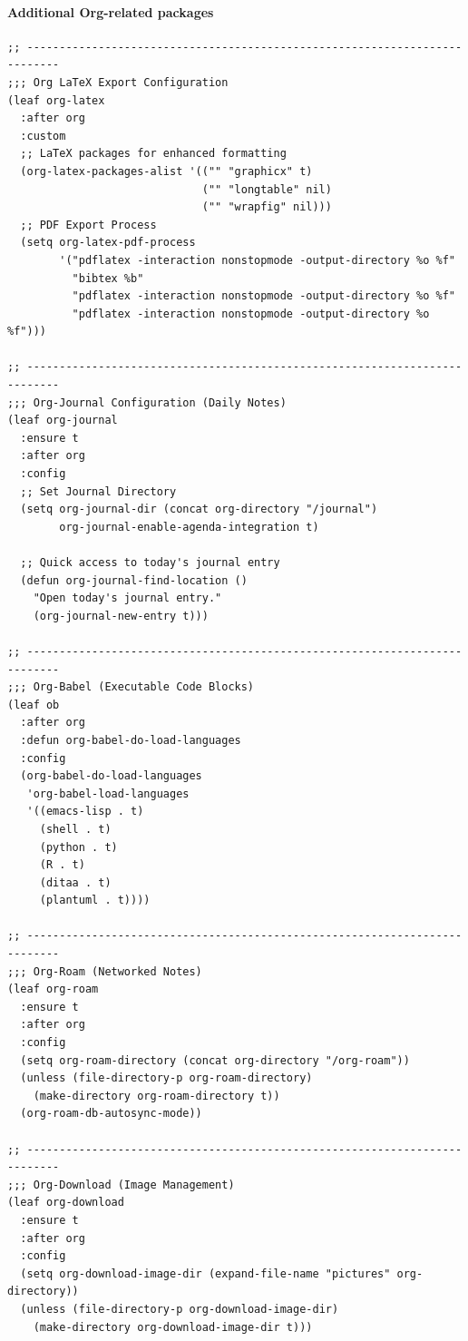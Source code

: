 \documentclass[11pt]{article}
\begin{document}
\paragraph{Additional Org-related packages}
\label{sec:org3c1865b}

\begin{verbatim}
;; ---------------------------------------------------------------------------
;;; Org LaTeX Export Configuration
(leaf org-latex
  :after org
  :custom
  ;; LaTeX packages for enhanced formatting
  (org-latex-packages-alist '(("" "graphicx" t)
                              ("" "longtable" nil)
                              ("" "wrapfig" nil)))
  ;; PDF Export Process
  (setq org-latex-pdf-process
        '("pdflatex -interaction nonstopmode -output-directory %o %f"
          "bibtex %b"
          "pdflatex -interaction nonstopmode -output-directory %o %f"
          "pdflatex -interaction nonstopmode -output-directory %o %f")))

;; ---------------------------------------------------------------------------
;;; Org-Journal Configuration (Daily Notes)
(leaf org-journal
  :ensure t
  :after org
  :config
  ;; Set Journal Directory
  (setq org-journal-dir (concat org-directory "/journal")
        org-journal-enable-agenda-integration t)

  ;; Quick access to today's journal entry
  (defun org-journal-find-location ()
    "Open today's journal entry."
    (org-journal-new-entry t)))

;; ---------------------------------------------------------------------------
;;; Org-Babel (Executable Code Blocks)
(leaf ob
  :after org
  :defun org-babel-do-load-languages
  :config
  (org-babel-do-load-languages
   'org-babel-load-languages
   '((emacs-lisp . t)
     (shell . t)
     (python . t)
     (R . t)
     (ditaa . t)
     (plantuml . t))))

;; ---------------------------------------------------------------------------
;;; Org-Roam (Networked Notes)
(leaf org-roam
  :ensure t
  :after org
  :config
  (setq org-roam-directory (concat org-directory "/org-roam"))
  (unless (file-directory-p org-roam-directory)
    (make-directory org-roam-directory t))
  (org-roam-db-autosync-mode))

;; ---------------------------------------------------------------------------
;;; Org-Download (Image Management)
(leaf org-download
  :ensure t
  :after org
  :config
  (setq org-download-image-dir (expand-file-name "pictures" org-directory))
  (unless (file-directory-p org-download-image-dir)
    (make-directory org-download-image-dir t)))


\end{verbatim}
\end{document}
